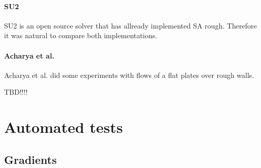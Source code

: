 \paragraph{SU2}
SU2 is an open source solver \cite{su2} that has allready implemented SA rough.
Therefore it was natural to compare both implementations.

\paragraph{Acharya et al.}
Acharya et al. did some experiments with flows of a flat plates over rough walls.


TBD!!!!

\section{Automated tests}

\subsection{Gradients}
